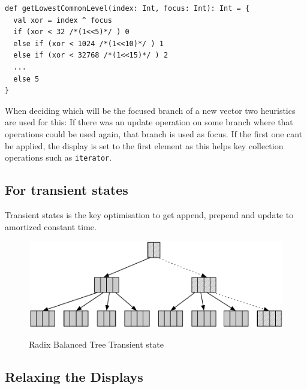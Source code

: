 \begin{lstlisting}[frame=single]
def getLowestCommonLevel(index: Int, focus: Int): Int = {
  val xor = index ^ focus
  if (xor < 32 /*(1<<5)*/ ) 0
  else if (xor < 1024 /*(1<<10)*/ ) 1
  else if (xor < 32768 /*(1<<15)*/ ) 2
  ...
  else 5
}
\end{lstlisting}

When deciding which will be the focused branch of a new vector two heuristics are used for this: If there was an update operation on some branch where that operations could be used again, that branch is used as focus. If the first one cant be applied, the display is set to the first element as this helps key collection operations such as \texttt{iterator}.


\subsection{For transient states}
Transient states is the key optimisation to get append, prepend and update to amortized constant time.

\begin{figure}[h!]
  \centering
  \includegraphics[width=\textwidth]{Figures/Transient_state}
  \label{Transient_state}
  \caption{Radix Balanced Tree Transient state}
\end{figure}



\subsection{Relaxing the Displays}

